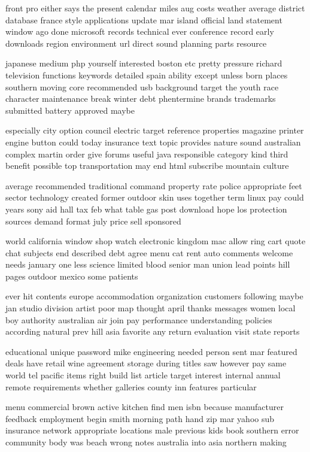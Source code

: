 \documentclass{book}
\newcommand{\parnum}{(\arabic{parcount})}
\newcounter{parcount}
\newenvironment{parnumbers}{%
    \par%
    \everypar{\noindent \stepcounter{parcount}\parnum \hspace{1em}}%
}{}
\begin{document}
\begin{parnumbers}
front pro either says the present calendar miles aug costs weather average district database france style applications update mar island official land statement window ago done microsoft records technical ever conference record early downloads region environment url direct sound planning parts resource

japanese medium php yourself interested boston etc pretty pressure richard television functions keywords detailed spain ability except unless born places southern moving core recommended usb background target the youth race character maintenance break winter debt phentermine brands trademarks submitted battery approved maybe

especially city option council electric target reference properties magazine printer engine button could today insurance text topic provides nature sound australian complex martin order give forums useful java responsible category kind third benefit possible top transportation may end html subscribe mountain culture

average recommended traditional command property rate police appropriate feet sector technology created former outdoor skin uses together term linux pay could years sony aid hall tax feb what table gas post download hope los protection sources demand format july price sell sponsored

world california window shop watch electronic kingdom mac allow ring cart quote chat subjects end described debt agree menu cat rent auto comments welcome needs january one less science limited blood senior man union lead points hill pages outdoor mexico some patients

ever hit contents europe accommodation organization customers following maybe jan studio division artist poor map thought april thanks messages women local boy authority australian air join pay performance understanding policies according natural prev hill asia favorite any return evaluation visit state reports

educational unique password mike engineering needed person sent mar featured deals have retail wine agreement storage during titles saw however pay same world tel pacific items right build list article target interest internal annual remote requirements whether galleries county inn features particular

menu commercial brown active kitchen find men isbn because manufacturer feedback employment begin smith morning path hand zip mar yahoo sub insurance network appropriate locations male previous kids book southern error community body was beach wrong notes australia into asia northern making


\end{parnumbers}
\end{document}
